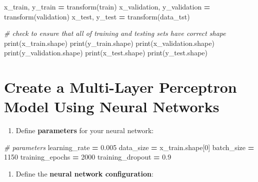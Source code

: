 \documentclass[]{book}
\newenvironment{Shaded}{\begin{snugshade}}{\end{snugshade}}
\newcommand{\DecValTok}[1]{\textcolor[rgb]{0.00,0.00,0.81}{#1}}
\newcommand{\FloatTok}[1]{\textcolor[rgb]{0.00,0.00,0.81}{#1}}
\newcommand{\CommentTok}[1]{\textcolor[rgb]{0.56,0.35,0.01}{\textit{#1}}}
\newcommand{\OperatorTok}[1]{\textcolor[rgb]{0.81,0.36,0.00}{\textbf{#1}}}
\newcommand{\BuiltInTok}[1]{#1}
\newcommand{\NormalTok}[1]{#1}
\providecommand{\tightlist}{%
  \setlength{\itemsep}{0pt}\setlength{\parskip}{0pt}}
\begin{document}
\begin{Shaded}
\begin{Highlighting}[]
\NormalTok{x_train, y_train }\OperatorTok{=}\NormalTok{ transform(train)}
\NormalTok{x_validation, y_validation }\OperatorTok{=}\NormalTok{ transform(validation)}
\NormalTok{x_test, y_test }\OperatorTok{=}\NormalTok{ transform(data_tst)}

 \CommentTok{# check to ensure that all of training and testing sets have correct shape}
\BuiltInTok{print}\NormalTok{(x_train.shape)}
\BuiltInTok{print}\NormalTok{(y_train.shape)}
\BuiltInTok{print}\NormalTok{(x_validation.shape)}
\BuiltInTok{print}\NormalTok{(y_validation.shape)  }
\BuiltInTok{print}\NormalTok{(x_test.shape)}
\BuiltInTok{print}\NormalTok{(y_test.shape)  }
\end{Highlighting}
\end{Shaded}

\hypertarget{create-a-multi-layer-perceptron-model-using-neural-networks}{%
\section{Create a Multi-Layer Perceptron Model Using Neural Networks}\label{create-a-multi-layer-perceptron-model-using-neural-networks}}

\begin{enumerate}
\def\labelenumi{\arabic{enumi}.}
\setcounter{enumi}{101}
\tightlist
\item
  Define \textbf{parameters} for your neural network:
\end{enumerate}

\begin{Shaded}
\begin{Highlighting}[]
\CommentTok{# parameters}
\NormalTok{learning_rate }\OperatorTok{=} \FloatTok{0.005}
\NormalTok{data_size }\OperatorTok{=}\NormalTok{ x_train.shape[}\DecValTok{0}\NormalTok{]}
\NormalTok{batch_size }\OperatorTok{=} \DecValTok{1150}
\NormalTok{training_epochs }\OperatorTok{=} \DecValTok{2000}
\NormalTok{training_dropout }\OperatorTok{=} \FloatTok{0.9}
\end{Highlighting}
\end{Shaded}

\begin{enumerate}
\def\labelenumi{\arabic{enumi}.}
\setcounter{enumi}{102}
\tightlist
\item
  Define the \textbf{neural network configuration}:
\end{enumerate}
\end{document}
